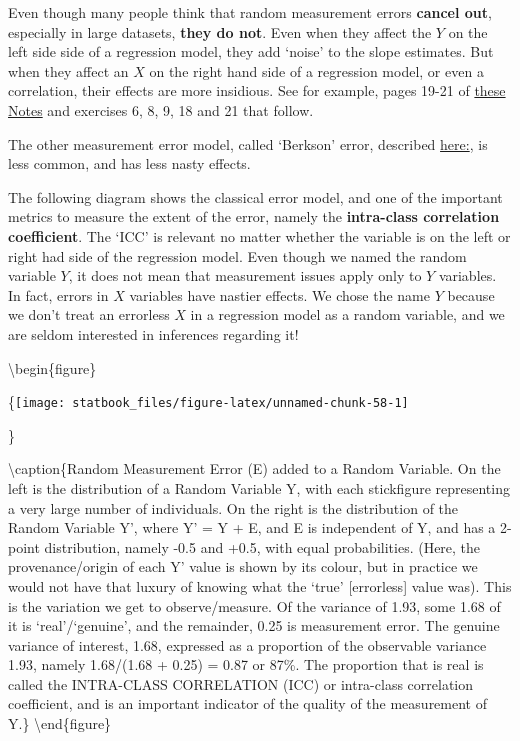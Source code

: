 \documentclass[]{book}
\begin{document}
Even though many people think that random measurement errors \textbf{cancel out}, especially in large datasets, \textbf{they do not}. Even when they affect the \(Y\) on the left side side of a regression model, they add `noise' to the slope estimates. But when they affect an \(X\) on the right hand side of a regression model, or even a correlation, their effects are more insidious. See for example, pages 19-21 of \href{http://www.medicine.mcgill.ca/epidemiology/hanley/bios601/hw_measurement2019.pdf\#page=19}{these Notes} and exercises 6, 8, 9, 18 and 21 that follow.

The other measurement error model, called `Berkson' error, described \href{http://www.medicine.mcgill.ca/epidemiology/hanley/bios601/Surveys/EffectsXerrorsNotesFromALM.pdf}{here:}, is less common, and has less nasty effects.

The following diagram shows the classical error model, and one of the important metrics to measure the extent of the error, namely the \textbf{intra-class correlation coefficient}. The `ICC' is relevant no matter whether the variable is on the left or right had side of the regression model. Even though we named the random variable \(Y\), it does not mean that measurement issues apply only to \(Y\) variables. In fact, errors in \(X\) variables have nastier effects. We chose the name \(Y\) because we don't treat an errorless \(X\) in a regression model as a random variable, and we are seldom interested in inferences regarding it!

\textbackslash{}begin\{figure\}

\{\centering \texttt{[image: statbook\_files/figure-latex/unnamed-chunk-58-1]}

\}

\textbackslash{}caption\{Random Measurement Error (E) added to a Random Variable. On the left is the distribution of a Random Variable Y, with each stickfigure representing a very large number of individuals. On the right is the distribution of the Random Variable Y', where Y' = Y + E, and E is independent of Y, and has a 2-point distribution, namely -0.5 and +0.5, with equal probabilities. (Here, the provenance/origin of each Y' value is shown by its colour, but in practice we would not have that luxury of knowing what the `true' {[}errorless{]} value was). This is the variation we get to observe/measure. Of the variance of 1.93, some 1.68 of it is `real'/`genuine', and the remainder, 0.25 is measurement error. The genuine variance of interest, 1.68, expressed as a proportion of the observable variance 1.93, namely 1.68/(1.68 + 0.25) = 0.87 or 87\%. The proportion that is real is called the INTRA-CLASS CORRELATION (ICC) or intra-class correlation coefficient, and is an important indicator of the quality of the measurement of Y.\}\label{fig:unnamed-chunk-58}
\textbackslash{}end\{figure\}
\end{document}
